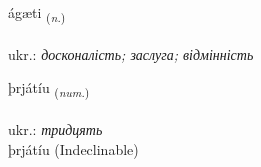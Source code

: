 \documentclass[frontgrid, backgrid]{flacards}\usepackage[]{graphicx}\usepackage[]{xcolor}
\begin{document}
\renewcommand{\flhead}{\vskip5pt \fboxsep=0pt {\small\bfseries\footnotesize Nafnorð | іменник}}
\renewcommand{\fcfoot}{\vskip5pt \fboxsep=0pt \hspace{2pt}{\small\bfseries\footnotesize 3K}}

\renewcommand{\blhead}{\vskip5pt {\small\bfseries\footnotesize Nafnorð | іменник }}
\renewcommand{\bcfoot}{\vskip5pt \hspace{2pt}{\small\bfseries\footnotesize 3K}}


{ágæti \small{\textsubscript{(\textit{n.})}} \\[1ex] %
\textphonetic{[auːcaitɪ]} \\
ukr.: \emph{досконалість; заслуга; відмінність} \\  [2ex]
\renewcommand*{\arraystretch}{0.8}
}


\renewcommand{\flhead}{\vskip5pt \fboxsep=0pt {\small\bfseries\footnotesize Töluorð | чисельник}}
\renewcommand{\fcfoot}{\vskip5pt \fboxsep=0pt \hspace{2pt}{\small\bfseries\footnotesize 3K}}

\renewcommand{\blhead}{\vskip5pt {\small\bfseries\footnotesize Töluorð | чисельник }}
\renewcommand{\bcfoot}{\vskip5pt \hspace{2pt}{\small\bfseries\footnotesize 3K}}


{þrjátíu \small{\textsubscript{(\textit{num.})}} \\[1ex]
\textphonetic{[θrjauːtʰijʏ]} \\
ukr.: \emph{тридцять} \\  [2ex]
þrjátíu (Indeclinable)}

\renewcommand{\flhead}{\vskip5pt \fboxsep=0pt {\small\bfseries\footnotesize Nafnorð | іменник}}
\renewcommand{\fcfoot}{\vskip5pt \fboxsep=0pt \hspace{2pt}{\small\bfseries\footnotesize 3K}}
\end{document}
